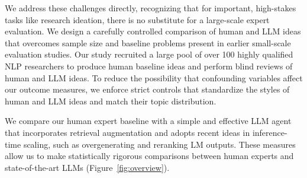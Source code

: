 %
%
%
%
%
%

We address these challenges directly, recognizing that for important, high-stakes tasks like research ideation, there is no substitute for a large-scale expert evaluation. We design a carefully controlled comparison of human and LLM ideas that overcomes sample size and baseline problems present in earlier small-scale evaluation studies. Our study recruited a large pool of over 100 highly qualified NLP researchers to produce human baseline ideas and perform blind reviews of human and LLM ideas. To reduce the possibility that confounding variables affect our outcome measures, we enforce strict controls that standardize the styles of human and LLM ideas and match their topic distribution.

We compare our human expert baseline with a simple and effective LLM agent that incorporates retrieval augmentation and adopts recent ideas in inference-time scaling, such as overgenerating and reranking LM outputs. 
These measures allow us to make statistically rigorous comparisons between human experts and state-of-the-art LLMs (Figure~\ref{fig:overview}). 

